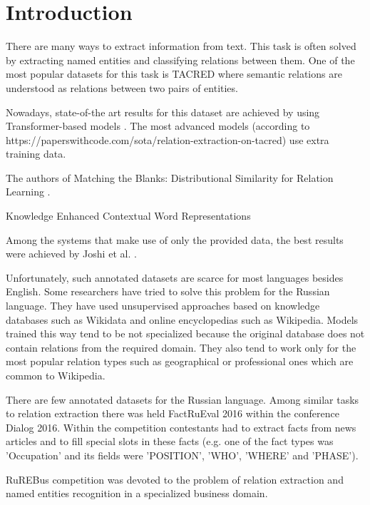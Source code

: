 \documentclass{dialogue}
\begin{document}

\section{Introduction}
There are many ways to extract information from text. This task is often solved by extracting named entities and classifying relations between them. One of the most popular datasets for this task is TACRED \cite{tacred} where semantic relations are understood as relations between two pairs of entities.

Nowadays, state-of-the art results for this dataset are achieved by using Transformer-based models \cite{attention}. The most advanced models (according to https://paperswithcode.com/sota/relation-extraction-on-tacred) use extra training data.

The authors of Matching the Blanks: Distributional Similarity for Relation Learning \cite{BaldiniSoares2019}.

Knowledge Enhanced Contextual Word Representations

Among the systems that make use of only the provided data, the best results were achieved by Joshi et al. \cite{spanbert}.

Unfortunately, such annotated datasets are scarce for most languages besides English. Some researchers have tried to solve this problem for the Russian language. They have used unsupervised approaches based on knowledge databases such as Wikidata and online encyclopedias such as Wikipedia. Models trained this way tend to be not specialized because the original database does not contain relations from the required domain. They also tend to work only for the most popular relation types such as geographical or professional ones which are common to Wikipedia.

There are few annotated datasets for the Russian language. Among similar tasks to relation extraction there was held FactRuEval 2016 within the conference Dialog 2016. Within the competition contestants had to extract facts from news articles and to fill special slots in these facts (e.g. one of the fact types was 'Occupation' and its fields were 'POSITION', 'WHO', 'WHERE' and 'PHASE').

RuREBus competition was devoted to the problem of relation extraction and named entities recognition in a specialized business domain.
\end{document}
